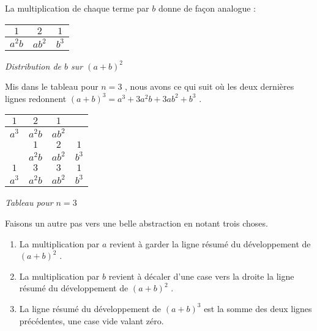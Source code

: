La multiplication de chaque terme par $b$ donne de façon analogue :

\medskip
\begin{center}
\begin{tabular}{*{3}{|c}|}
	\hline
		$1$      &  $2$      &  $1$
	\\ \hline
		$a^2 b$  &  $a b^2$  &  $b^3$
	\\ \hline
\end{tabular}

\smallskip
\itshape\small
Distribution de $b$ sur $(a + b)^2$
\end{center}


\medskip

Mis dans le tableau pour $n = 3$ , nous avons ce qui suit où les deux dernières lignes redonnent $(a + b)^3 = a^3 + 3 a^2 b + 3 a b^2 + b^3$ .

\medskip
\begin{center}
\begin{tabular}{*{4}{|c}|}
	\hline
		$1$    &  $2$      &  $1$      &
	\\ \hline
		$a^3$  &  $a^2 b$  &  $a b^2$  &
	\\ \hline\hline
		       &  $1$      &  $2$      &  $1$
	\\ \hline
		       &  $a^2 b$  &  $a b^2$  &  $b^3$
	\\ \hline\hline\hline\hline
		$1$    &  $3$      &  $3$      &  $1$
	\\ \hline
		$a^3$  &  $a^2 b$  &  $a b^2$  &  $b^3$
	\\ \hline
\end{tabular}

\smallskip
\itshape\small
Tableau pour $n = 3$
\end{center}


\medskip

Faisons un autre pas vers une belle abstraction en notant trois choses.

\begin{enumerate}
	\item La multiplication par $a$ revient à garder la ligne résumé du développement de $(a + b)^2$ .

	\item La multiplication par $b$ revient à décaler d'une case vers la droite la ligne résumé du développement de $(a + b)^2$ .

	\item La ligne résumé du développement de $(a + b)^3$ est la somme des deux lignes précédentes, une case vide valant zéro.
\end{enumerate}


